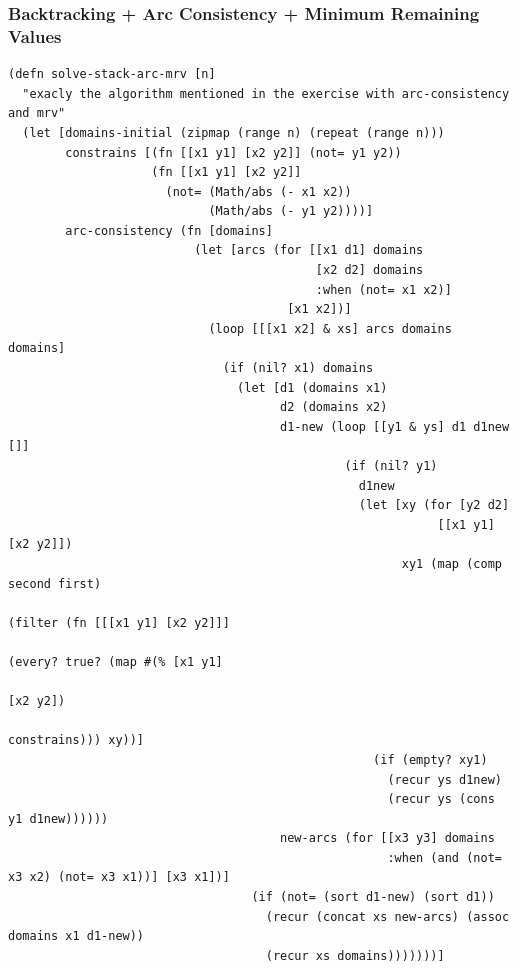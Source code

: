 \documentclass[a4paper,10pt]{article}
\begin{document}
\subsubsection*{Backtracking + Arc Consistency + Minimum Remaining Values}
\begin{lstlisting}
(defn solve-stack-arc-mrv [n]
  "exacly the algorithm mentioned in the exercise with arc-consistency and mrv"
  (let [domains-initial (zipmap (range n) (repeat (range n)))
        constrains [(fn [[x1 y1] [x2 y2]] (not= y1 y2))
                    (fn [[x1 y1] [x2 y2]]
                      (not= (Math/abs (- x1 x2))
                            (Math/abs (- y1 y2))))]
        arc-consistency (fn [domains]
                          (let [arcs (for [[x1 d1] domains
                                           [x2 d2] domains
                                           :when (not= x1 x2)]
                                       [x1 x2])]
                            (loop [[[x1 x2] & xs] arcs domains domains]
                              (if (nil? x1) domains
                                (let [d1 (domains x1)
                                      d2 (domains x2)
                                      d1-new (loop [[y1 & ys] d1 d1new []]
                                               (if (nil? y1)
                                                 d1new
                                                 (let [xy (for [y2 d2]
                                                            [[x1 y1] [x2 y2]])
                                                       xy1 (map (comp second first)
                                                                (filter (fn [[[x1 y1] [x2 y2]]]
                                                                          (every? true? (map #(% [x1 y1] 
                                                                                                 [x2 y2])
                                                                                         constrains))) xy))]
                                                   (if (empty? xy1)
                                                     (recur ys d1new)
                                                     (recur ys (cons y1 d1new))))))
                                      new-arcs (for [[x3 y3] domains
                                                     :when (and (not= x3 x2) (not= x3 x1))] [x3 x1])]
                                  (if (not= (sort d1-new) (sort d1))
                                    (recur (concat xs new-arcs) (assoc domains x1 d1-new))
                                    (recur xs domains)))))))]

\end{lstlisting}
\end{document}
